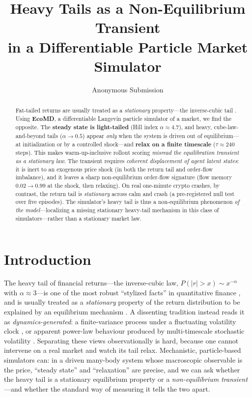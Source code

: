 \documentclass{article}
\title{Heavy Tails as a Non-Equilibrium Transient\\ in a Differentiable Particle Market Simulator}
\author{Anonymous Submission}
\date{}
\begin{document}
\maketitle

\begin{abstract}
Fat-tailed returns are usually treated as a \emph{stationary} property---the inverse-cubic tail
\citep{gabaix2003,plerou1999}. Using \textbf{EcoMD}, a differentiable Langevin particle simulator of a
market, we find the opposite. The \textbf{steady state is light-tailed} (Hill index $\alpha\!\approx\!4.7$),
and heavy, cube-law-and-beyond tails ($\alpha\!\to\!0.5$) appear \emph{only} when the system is driven
out of equilibrium---at initialization or by a controlled shock---and \textbf{relax on a finite
timescale} ($\tau\!\approx\!240$ steps). This makes warm-up-inclusive rollout scoring \emph{misread the
equilibration transient as a stationary law}. The transient requires \emph{coherent displacement of
agent latent states}: it is inert to an exogenous price shock (in both the return tail and order-flow
imbalance), and it leaves a sharp non-equilibrium order-flow signature (flow memory $0.02\!\to\!0.99$
at the shock, then relaxing). On real one-minute crypto crashes, by contrast, the return tail is
\emph{stationary} across calm and crash (a pre-registered null test over five episodes). The
simulator's heavy tail is thus a non-equilibrium phenomenon \emph{of the model}---localizing a missing
stationary heavy-tail mechanism in this class of simulators---rather than a stationary market law.
\end{abstract}

\section{Introduction}
The heavy tail of financial returns---the inverse-cubic law, $P(|r|\!>\!x)\!\sim\!x^{-\alpha}$ with
$\alpha\!\approx\!3$---is one of the most robust ``stylized facts'' in quantitative finance
\citep{cont2001,gabaix2003,plerou1999}, and is usually treated as a \emph{stationary} property of the
return distribution to be explained by an equilibrium mechanism \citep{gabaix2003}. A dissenting
tradition instead reads it as \emph{dynamics-generated}: a finite-variance process under a fluctuating
volatility clock \citep{clark1973}, or apparent power-law behaviour produced by multi-timescale
stochastic volatility \citep{lebaron2001}. Separating these views observationally is hard, because one
cannot intervene on a real market and watch its tail relax. Mechanistic, particle-based simulators can:
in a driven many-body system whose macroscopic observable is the price, ``steady state'' and
``relaxation'' are precise, and we can ask whether the heavy tail is a stationary equilibrium property
or a \emph{non-equilibrium transient}---and whether the standard way of measuring it tells the two apart.
\end{document}
